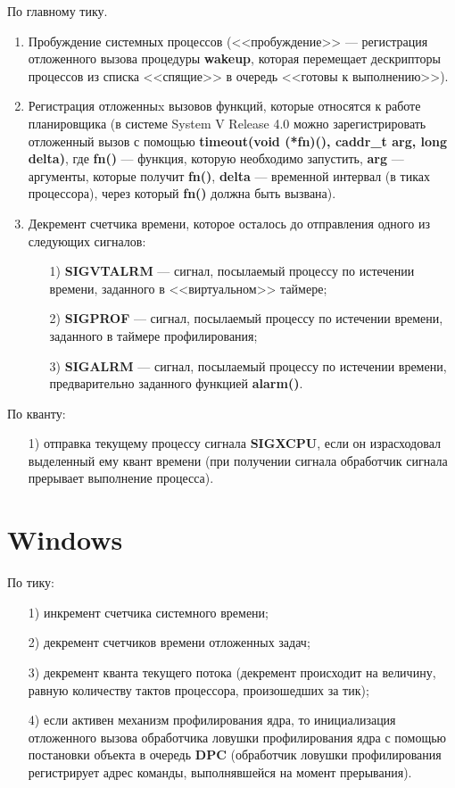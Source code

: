 \documentclass{bmstu}
\begin{document}
По главному тику.
\begin{enumerate}
\item Пробуждение системных процессов (<<пробуждение>> --- регистрация отложенного вызова процедуры \textbf{wakeup}, которая перемещает дескрипторы процессов из списка <<спящие>> в очередь <<готовы к выполнению>>).
\item Регистрация отложенныx вызовов функций, которые относятся к работе планировщика (в системе System V Release 4.0 можно зарегистрировать отложенный вызов с помощью \textbf{timeout(void (*fn)(), caddr\_t arg, long delta)}, где \textbf{fn()} --- функция, которую необходимо запустить, \textbf{arg} --- аргументы, которые получит \textbf{fn()}, \textbf{delta} --- временной интервал (в тиках процессора), через который \textbf{fn()} должна быть вызвана).
\item Декремент счетчика времени, которое осталось до отправления одного из следующих сигналов:
\begin{enumerate}
\item[1)] \textbf{SIGVTALRM} --- сигнал, посылаемый процессу по истечении времени, заданного в <<виртуальном>> таймере;
\item[2)] \textbf{SIGPROF} --- сигнал, посылаемый процессу по истечении времени, заданного в таймере профилирования;
\item[3)] \textbf{SIGALRM} --- сигнал, посылаемый процессу по истечении времени, предварительно заданного функцией \textbf{alarm()}.	
\end{enumerate}
\end{enumerate}

По кванту:
\begin{enumerate}
\item[1)] отправка текущему процессу сигнала \textbf{SIGXCPU}, если он израсходовал выделенный ему квант времени (при получении сигнала обработчик сигнала прерывает выполнение процесса).
\end{enumerate}

\section{Windows}

По тику:
\begin{enumerate}
\item[1)] инкремент счетчика системного времени;
\item[2)] декремент счетчиков времени отложенных задач;
\item[3)] декремент кванта текущего потока (декремент происходит на величину, равную количеству тактов процессора, произошедших за тик);
\item[4)] если активен механизм профилирования ядра, то инициализация отложенного вызова обработчика ловушки профилирования ядра с помощью постановки объекта в очередь \textbf{DPC} (обработчик ловушки профилирования регистрирует адрес команды, выполнявшейся на момент прерывания).
\end{enumerate}
\end{document}
